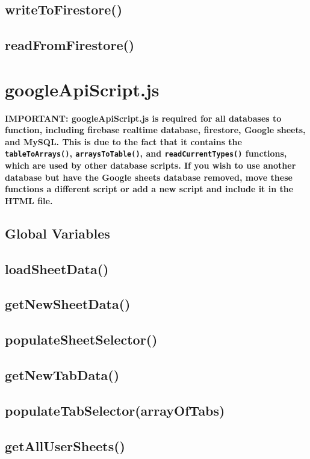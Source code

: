 \documentclass[letterpaper]{article}
\begin{document}
\subsection{writeToFirestore()}
\subsection{readFromFirestore()}

\newpage

\section{googleApiScript.js}

\textbf{IMPORTANT: googleApiScript.js is required for all databases to function, including firebase realtime database, firestore, Google sheets, and MySQL.
This is due to the fact that it contains the \lstinline{tableToArrays()}, \lstinline{arraysToTable()}, and \lstinline{readCurrentTypes()} functions, which are used by other database scripts.
If you wish to use another database but have the Google sheets database removed, move these functions a different script or add a new script and include it in the HTML file.}

\subsection{Global Variables}
\subsection{loadSheetData()}
\subsection{getNewSheetData()}
\subsection{populateSheetSelector()}
\subsection{getNewTabData()}
\subsection{populateTabSelector(arrayOfTabs)}
\subsection{getAllUserSheets()}
\end{document}
